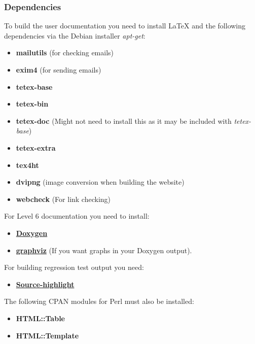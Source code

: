 \documentclass[12pt]{article}
\begin{document}
\subsubsection*{Dependencies}

To build the user documentation you need to install \LaTeX\,\,and the following dependencies via the Debian installer {\it apt-get}:
\begin{itemize}
\item[]{\bf mailutils} (for checking emails)
\item[]{\bf exim4} (for sending emails)
\item[]{\bf tetex-base}
\item[]{\bf tetex-bin}
\item[]{\bf tetex-doc} (Might not need to install this as it may be included with {\it tetex-base})
\item[]{\bf tetex-extra}
\item[]{\bf tex4ht}
\item[]{\bf dvipng} (image conversion when building the website)
\item[]{\bf webcheck} (For link checking) 
\end{itemize}
For Level 6 documentation you need to install:
\begin{itemize}
   \item[]\href{http://www.doxygen.org/}{\bf Doxygen}
   \item[]\href{http://www.graphviz.org/Download.php}{\bf graphviz} (If you want graphs in your Doxygen output).
\end{itemize}
For building regression test output you need:
\begin{itemize}
   \item[]\href{http://www.gnu.org/software/src-highlite/}{\bf Source-highlight} 
\end{itemize}
The following CPAN modules for Perl must also be installed:
\begin{itemize}
   \item[]{\bf HTML::Table}
   \item[]{\bf HTML::Template}
\end{itemize}
\end{document}
